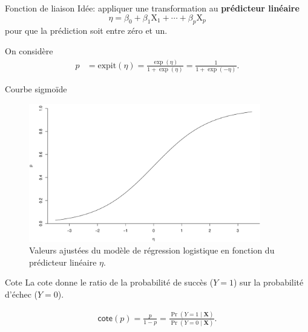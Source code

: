 \documentclass[
  ignorenonframetext,
]{beamer}
\begin{document}
\begin{frame}{Fonction de liaison}
\protect\hypertarget{fonction-de-liaison}{}
Idée: appliquer une transformation au \textbf{prédicteur linéaire}
\[\eta = \beta_0 + \beta_1 \mathrm{X}_1 + \cdots + \beta_p \mathrm{X}_p\]
pour que la prédiction soit entre zéro et un.

On considère \begin{align*}
 p &= \textrm{expit}(\eta) = \frac{\exp(\eta)}{1+\exp(\eta)}
= \frac{1}{1+\exp(-\eta)}.
\end{align*}
\end{frame}

\begin{frame}{Courbe sigmoïde}
\protect\hypertarget{courbe-sigmouxefde}{}
\begin{figure}

{\centering \includegraphics[width=0.9\textwidth,height=\textheight]{MATH60602-diapos6_files/figure-beamer/fig-logitplot-1.pdf}

}

\caption{\label{fig-logitplot}Valeurs ajustées du modèle de régression
logistique en fonction du prédicteur linéaire \(\eta\).}

\end{figure}
\end{frame}

\begin{frame}{Cote}
\protect\hypertarget{cote}{}
La cote donne le ratio de la probabilité de succès (\(Y=1\)) sur la
probabilité d'échec (\(Y=0\)).

\begin{align*}
 \mathsf{cote}(p) = \frac{p}{1-p} = \frac{\Pr(Y=1 \mid \mathbf{X})}{\Pr(Y=0 \mid \mathbf{X})}.
\end{align*}
\end{frame}
\end{document}
